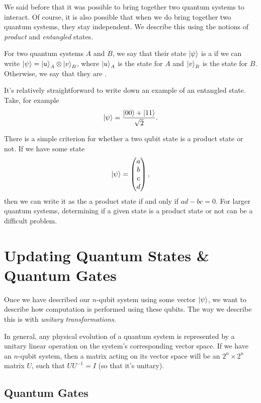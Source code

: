 \documentclass[11pt]{article}
\begin{document}
We said before that it was possible to bring together two quantum systems to interact. Of course, it is also possible that when we do bring together two quantum systems, they stay independent. We describe this using the notions of \emph{product} and \emph{entangled} states.

\begin{definition*}
	For two quantum systems $A$ and $B$, we say that their state $\ket{\psi}$ is a  if we can write $\ket{\psi} = \ket{u}_A\otimes \ket{v}_B$, where $\ket{u}_A$ is the state for $A$ and $\ket{v}_B$ is the state for $B$.
	Otherwise, we say that they are .
\end{definition*}

It's relatively straightforward to write down an example of an entangled state. Take, for example
$$
\ket{\psi} = \frac{\ket{00} + \ket{11}}{\sqrt{2}}.
$$

There is a simple criterion for whether a two qubit state is a product state or not. If we have some state
$$
\ket{\psi} = \begin{pmatrix}
	a \\ b \\ c \\ d
\end{pmatrix},
$$ 
then we can write it as the a product state if and only if $ad - bc = 0$. For larger quantum systems, determining if a given state is a product state or not can be a difficult problem.


\section{Updating Quantum States \& Quantum Gates}

Once we have described our $n$-qubit system using some vector $\ket{\psi}$, we want to describe how computation is performed using these qubits. The way we describe this is with \emph{unitary transformations}.

In general, any physical evolution of a quantum system is represented by a unitary linear operation on the system's corresponding vector space.
If we have an $n$-qubit system, then a matrix acting on its vector space will be an $2^n \times 2^n$ matrix $U$, such that $U U^{-1} = I$ (so that it's unitary).

\subsection{Quantum Gates}
\end{document}
